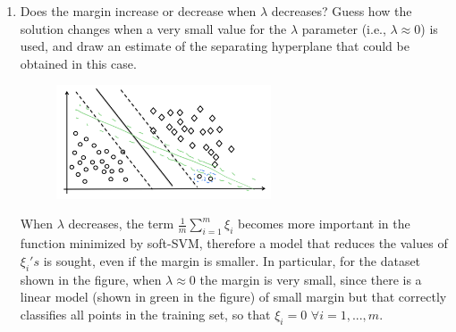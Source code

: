 \documentclass[a4paper,11pt,oneside]{book}
\begin{document}
\begin{enumerate}
    \clearpage
    \item Does the margin increase or decrease when \(\lambda\) decreases? Guess how the solution changes when a very small value for the \(\lambda\) parameter (i.e., \(\lambda \approx 0\)) is used, and draw an estimate of the separating hyperplane that could be obtained in this case.
        \begin{figure}[H]
            \centering
            \includegraphics[width=0.6\textwidth,height=0.6\textheight,keepaspectratio]{images/3_7_Feb_2020.png}
        \end{figure}
        \begin{solution}
            When $\lambda$ decreases, the term $\frac{1}{m}\sum_{i=1}^m \xi_i$ becomes more important in the function minimized by soft-SVM, therefore a model that reduces the values of $\xi_i's$ is sought, even if the margin is smaller. In particular, for the dataset shown in the figure, when $\lambda \approx 0$ the margin is very small, since there is a linear model (shown in green in the figure) of small margin but that correctly classifies all points in the training set, so that $\xi_i=0$ $\forall i=1,...,m$.
        \end{solution}
\end{enumerate}
\end{document}
